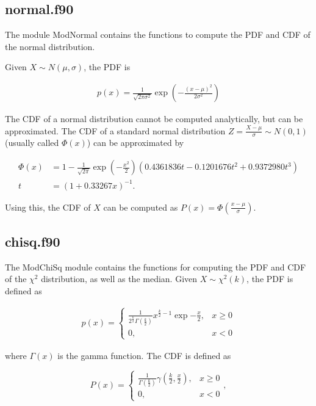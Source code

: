 \documentclass[a4paper]{article}
\begin{document}
\subsection{normal.f90}

The module ModNormal contains the functions to compute the PDF and CDF of the normal distribution.

Given $X \sim N(\mu,\sigma)$, the PDF is

\begin{align}
    p(x) = \frac{1}{\sqrt{2\pi\sigma^2}} \exp\left(  -\frac{\left(x-\mu\right)^2}{2\sigma^2} \right)
\end{align}

The CDF of a normal distribution cannot be computed analytically, but can be approximated. The CDF of a standard normal distribution $Z = \frac{X-\mu}{\sigma} \sim N(0,1)$ (usually called $\Phi(x)$) can be approximated by

\begin{align}
    \Phi(x) &= 1 - \frac{1}{\sqrt{2\pi}} \exp \left(-\frac{x^2}{2}\right) \left( 0.4361836t - 0.1201676 t^2 + 0.9372980 t^3 \right)\\
    t &= \left( 1 + 0.33267x \right)^{-1}.
\end{align}

Using this, the CDF of $X$ can be computed as $P(x) = \Phi(\frac{x-\mu}{\sigma})$.

\subsection{chisq.f90}

The ModChiSq module contains the functions for computing the PDF and CDF of the $\chi^2$ distribution, as well as the median. Given $X \sim \chi^2(k)$, the PDF is defined as

\begin{align}
    p(x) = \left\{ \begin{array}{ll}
    \frac{1}{2^{\frac{k}{2}} \Gamma \left(\frac{k}{2} \right)} x^{\frac{k}{2} - 1} \exp{-\frac{x}{2}}, & x \ge 0 \\
    0, & x < 0
    \end{array} \right.
\end{align}

where $\Gamma(x)$ is the gamma function. The CDF is defined as 

\begin{equation}
    P(x) = \left\{ \begin{array}{ll}
        \frac{1}{\Gamma \left(\frac{k}{2} \right)} \gamma\left(\frac{k}{2}, \frac{x}{2} \right), & x \ge 0 \\
        0, & x<0
    \end{array}\right.,
\end{equation}
\end{document}
